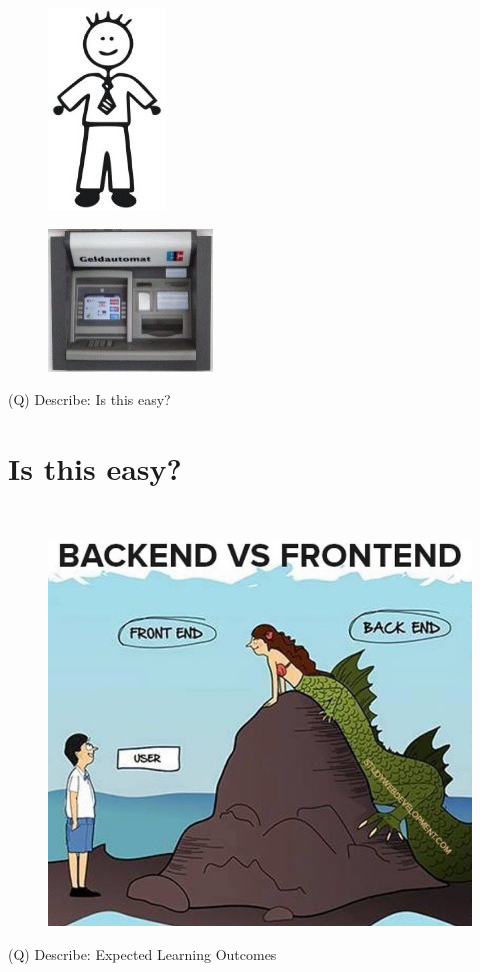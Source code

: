 \documentclass[12pt]{article}
\begin{document}
\begin{figure}[H]
\includegraphics[width=0.5\linewidth]{page19-image-3.png}
\end{figure}
\begin{figure}[H]
\includegraphics[width=0.5\linewidth]{page19-image-4.png}
\end{figure}
\clearpage
(Q)
Describe: Is this easy?
\clearpage
\section{Is this easy?}
\\
\begin{figure}[H]
\includegraphics[width=0.5\linewidth]{page20-image-1.png}
\end{figure}
\clearpage
(Q)
Describe: Expected Learning Outcomes
\clearpage
\end{document}
